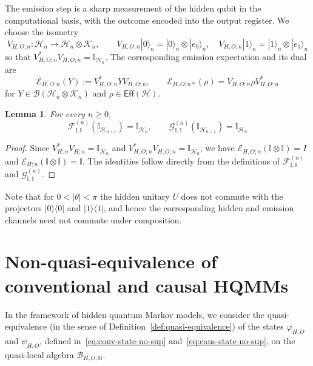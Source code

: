 \documentclass[11pt, reco]{article}
\newtheorem{lemma}[theorem]{Lemma}
\begin{document}
The emission step is a sharp measurement of the hidden qubit in the computational basis, with the outcome encoded into the output register. We choose the isometry
\begin{equation}\label{VHO_Qubit}
V_{H,O;n}:\mathcal{H}_n\longrightarrow\mathcal{H}_n\otimes\mathcal{K}_n,
\qquad
V_{H,O;n}|0\rangle_n
=
|0\rangle_n\otimes|e_0\rangle_n,\quad
V_{H,O;n}|1\rangle_n
=
|1\rangle_n\otimes|e_1\rangle_n
\end{equation}
so that $V_{H,O;n}^{*}V_{H,O;n}=\mathbb{I}_{\mathcal{H}_n}$. The corresponding emission expectation and its dual are
\[
\mathcal{E}_{H,O;n}(Y)
:=
V_{H,O;n}^{*}YV_{H,O;n},
\qquad
\mathcal{E}_{H,O;n*}(\rho)
=
V_{H,O;n}\rho V_{H,O;n}^{*}
\]
for $Y\in\mathcal{B}(\mathcal{H}_n\otimes\mathcal{K}_n)$ and $\rho\in\mathsf{Eff}(\mathcal{H})$.
\begin{lemma}
For every $n \ge 0$,
\[
\mathcal{F}^{(n)}_{\mathbb{I}, \mathbb{I}}(\mathbb{I}_{\mathcal{H}_{n+1}}) =\mathbb{I}_{\mathcal{H}_n}, \qquad
\mathcal{G}^{(n)}_{\mathbb{I}, \mathbb{I}}(\mathbb{I}_{\mathcal{H}_{n+1}}) =\mathbb{I}_{\mathcal{H}_n}
\]
\end{lemma}

\begin{proof}
Since $V_{H;n}^*V_{H;n} =\mathbb{I}_{\mathcal{H}_n}$ and $V_{H,O;n}^*V_{H,O;n} =\mathbb{I}_{\mathcal{H}_n}$, we have $\mathcal{E}_{H,O;n}(\mathbb{I} \otimes\mathbb{I})= I$ and $\mathcal{E}_{H;n}(\mathbb{I} \otimes\mathbb{I})= \mathbb{I}$. The identities follow directly from the definitions of $\mathcal{F}^{(n)}_{\mathbb{I}, \mathbb{I}}$ and $\mathcal{G}^{(n)}_{\mathbb{I}, \mathbb{I}}$.
\end{proof}
Note that for $0<|\theta|<\pi$ the hidden unitary $U$ does not commute with the projectors $|0\rangle\langle 0|$ and $|1\rangle\langle 1|$, and hence the corresponding hidden and emission channels need not commute under composition.


 



\section{Non-quasi-equivalence of conventional and causal HQMMs}
In the framework of hidden quantum Markov models, we consider the quasi-equivalence (in the sense of Definition~\ref{def:quasi-equivalence}) of the states $\varphi_{H,O}$ and $\psi_{H,O}$, defined in~\eqref{eq:conv-state-no-sup} and~\eqref{eq:caus-state-no-sup}, on the quasi-local algebra $\mathcal{B}_{H,O;\mathbb{N}}$.
\end{document}
